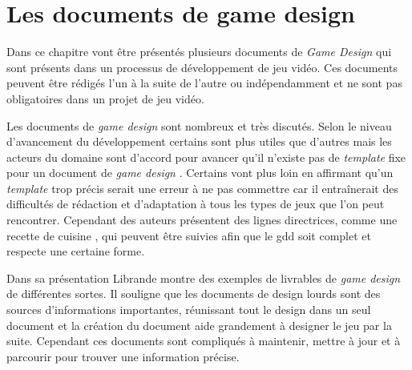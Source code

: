\chapter{Les documents de game design}

Dans ce chapitre vont être présentés plusieurs documents de \emph{Game Design} qui sont présents dans un processus de développement de jeu vidéo. Ces documents peuvent être rédigés l'un à la suite de l'autre ou indépendamment et ne sont pas obligatoires dans un projet de jeu vidéo.

Les documents de \emph{game design} sont nombreux et très discutés. Selon le niveau d'avancement du développement certains sont plus utiles que d'autres mais les acteurs du domaine sont d'accord pour avancer qu'il n'existe pas de \emph{template} fixe pour un document de \emph{game design} \cite{GD_theory_rouse}. Certains vont plus loin en affirmant qu'un \emph{template} trop précis serait une erreur à ne pas commettre car il entraînerait des difficultés de rédaction et d'adaptation à tous les types de jeux que l'on peut rencontrer. Cependant des auteurs présentent des lignes directrices, comme une recette de cuisine \cite{LevelUpRogers2014}, qui peuvent être suivies afin que le \gls{gdd} soit complet et respecte une certaine forme. 

Dans sa présentation Librande \cite{onepage_librande} montre des exemples de livrables de \emph{game design} de différentes sortes. Il souligne que les documents de design lourds sont des sources d'informations importantes, réunissant tout le design dans un seul document et la création du document aide grandement à designer le jeu par la suite. Cependant ces documents sont compliqués à maintenir, mettre à jour et à parcourir pour trouver une information précise.

